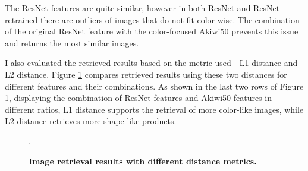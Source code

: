 \documentclass[12pt]{report}
\begin{document}
The ResNet features are quite similar, however in both ResNet and ResNet retrained there are outliers of images that do not fit color-wise. The combination of the original ResNet feature with the color-focused Akiwi50 prevents this issue and returns the most similar images.

I also evaluated the retrieved results based on the metric used - L1 distance and L2 distance. Figure \ref{fig:search_weights} compares retrieved results  using these two distances for different features and their combinations. As shown in the last two rows of Figure \ref{fig:search_weights}, displaying the combination of ResNet features and Akiwi50 features in different ratios, L1 distance supports the retrieval of more color-like images, while L2 distance retrieves more shape-like products. 

\begin{figure}[!h]
\centering
{}\hspace{0.2cm}
\caption{\label{fig:search_weights} \textbf{Image retrieval results with different distance metrics.}}.
\end{figure}
\end{document}
